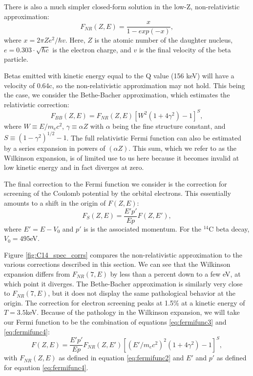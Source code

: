 There is also a much simpler closed-form solution in the low-Z, non-relativistic approximation\cite{beta_fermi}:
\begin{equation}\label{eq:fermifunc2}
F_{NR}(Z,E)=\frac{x}{1-exp(-x)},
\end{equation}
where $x=2\pi Ze^{2}/\hbar v$. Here, $Z$ is the atomic number of the daughter nucleus, $e=0.303 \cdot\sqrt{\hbar c}$ is the electron charge, and $v$ is the final velocity of the beta particle. 

Betas emitted with kinetic energy equal to the Q value (156 keV) will have a velocity of 0.64c, so the non-relativistic approximation may not hold. This being the case, we consider the Bethe-Bacher approximation, which estimates the relativistic correction\cite{beta_fermi,bethe}:
\begin{equation}\label{eq:fermifunc3}
F_{BB}(Z,E)=F_{NR}(Z,E)[W^2(1+4\gamma^2)-1]^S,
\end{equation}
where $W\equiv E/m_ec^2$, $\gamma \equiv \alpha Z$ with $\alpha$ being the fine structure constant, and $S\equiv (1-\gamma^2)^{1/2}-1$. The full relativistic Fermi function can also be estimated by a series expansion in powers of $(\alpha Z)$\cite{wilkinson,C14_Wietfeldt}. This sum, which we refer to as the Wilkinson expansion, is of limited use to us here because it becomes invalid at low kinetic energy and in fact diverges at zero.

The final correction to the Fermi function we consider is the correction for screening of the Coulomb potential by the orbital electrons. This essentially amounts to a shift in the origin of $F(Z,E)$\cite{C14_Wietfeldt,beta_screening}:
\begin{equation}\label{eq:fermifunc4}
F_{S}(Z,E)=\frac{E'p'}{Ep}F(Z,E'),
\end{equation}
where $E'=E-V_0$ and $p'$ is is the associated momentum. For the $^{14}$C beta decay, $V_0=495$eV\cite{C14_Wietfeldt}.

Figure \ref{fig:C14_spec_corrs} compares the non-relativistic approximation to the various corrections described in this section. We can see that the Wilkinson expansion differs from $F_{NR}(7,E)$ by less than a percent down to a few eV, at which point it diverges. The Bethe-Bacher approximation is similarly very close to $F_{NR}(7,E)$, but it does not display the same pathological behavior at the origin. The correction for electron screening peaks at 1.5\% at a kinetic energy of $T=3.5$keV. Because of the pathology in the Wilkinson expansion, we will take our Fermi function to be the combination of equations \ref{eq:fermifunc3} and \ref{eq:fermifunc4}:
\begin{equation}\label{eq:fermifunc5}
F(Z,E)=\frac{E'p'}{Ep}F_{NR}(Z,E')[(E'/m_ec^2)^2(1+4\gamma^2)-1]^S,
\end{equation}
with $F_{NR}(Z,E)$ as defined in equation \ref{eq:fermifunc2} and $E'$ and $p'$ as defined for eqaution \ref{eq:fermifunc4}.


